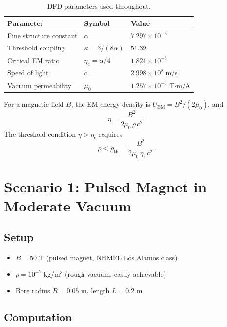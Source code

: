 \documentclass[12pt,a4paper]{article}
\newcommand{\etac}{\eta_{\mathrm{c}}}
\begin{document}
\begin{table}[H]
\centering
\begin{tabular}{lll}
\toprule
\textbf{Parameter} & \textbf{Symbol} & \textbf{Value} \\
\midrule
Fine structure constant & $\alpha$ & $7.297 \times 10^{-3}$ \\
Threshold coupling & $\kappa = 3/(8\alpha)$ & $51.39$ \\
Critical EM ratio & $\etac = \alpha/4$ & $1.824 \times 10^{-3}$ \\
Speed of light & $c$ & $2.998 \times 10^8$ m/s \\
Vacuum permeability & $\mu_0$ & $1.257 \times 10^{-6}$ T$\cdot$m/A \\
\bottomrule
\end{tabular}
\caption{DFD parameters used throughout.}
\end{table}

For a magnetic field $B$, the EM energy density is $U_{\mathrm{EM}} = B^2/(2\mu_0)$, and
\begin{equation}
\eta = \frac{B^2}{2\mu_0\,\rho\, c^2}\,.
\end{equation}
The threshold condition $\eta > \etac$ requires
\begin{equation}
\label{eq:rho_threshold}
\rho < \rho_{\mathrm{th}} = \frac{B^2}{2\mu_0\,\etac\, c^2}\,.
\end{equation}

\section{Scenario 1: Pulsed Magnet in Moderate Vacuum}
\label{sec:scenario1}

\subsection{Setup}

\begin{itemize}
\item $B = 50$ T (pulsed magnet, NHMFL Los Alamos class)
\item $\rho = 10^{-7}$ kg/m$^3$ (rough vacuum, easily achievable)
\item Bore radius $R = 0.05$ m, length $L = 0.2$ m
\end{itemize}

\subsection{Computation}
\end{document}
